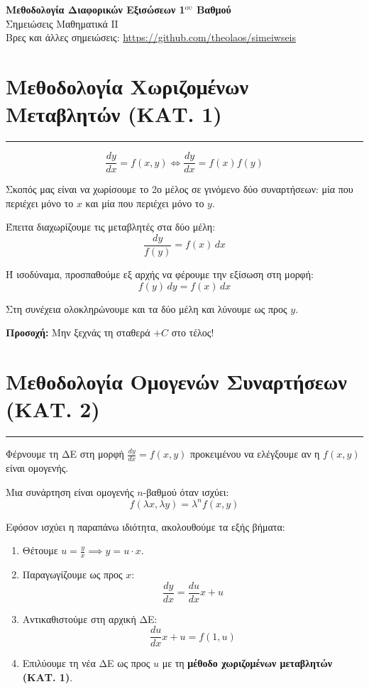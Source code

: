 \documentclass[12pt,a4paper]{article}
\begin{document}
\begin{center}
    \LARGE \textbf{Μεθοδολογία Διαφορικών Εξισώσεων 1$^{\text{ου}}$ Βαθμού}\\[0.5ex]
    \large Σημειώσεις Μαθηματικά ΙΙ \\
    \normalsize Βρες και άλλες σημειώσεις: \url{https://github.com/theolaos/simeiwseis}
\end{center}

\section*{Μεθοδολογία Χωριζομένων Μεταβλητών (ΚΑΤ. 1)}
\vspace{-1em}
\hrule
\vspace{1em}


\[
\frac{dy}{dx} = f(x,y) \iff \frac{dy}{dx} = f(x)f(y)
\]

Σκοπός μας είναι να χωρίσουμε το 2ο μέλος σε γινόμενο δύο συναρτήσεων: μία που περιέχει μόνο το $x$ και μία που περιέχει μόνο το $y$.

Έπειτα διαχωρίζουμε τις μεταβλητές στα δύο μέλη:
\[
\frac{dy}{f(y)} = f(x)\,dx
\]

Ή ισοδύναμα, προσπαθούμε εξ αρχής να φέρουμε την εξίσωση στη μορφή:
\[
f(y)\,dy = f(x)\,dx
\]

Στη συνέχεια ολοκληρώνουμε και τα δύο μέλη και λύνουμε ως προς $y$.

\textbf{Προσοχή:} Μην ξεχνάς τη σταθερά $+C$ στο τέλος!


\section*{Μεθοδολογία Ομογενών Συναρτήσεων (ΚΑΤ. 2)}
\vspace{-1em}
\hrule
\vspace{1em}

Φέρνουμε τη ΔΕ στη μορφή $\frac{dy}{dx} = f(x,y)$ προκειμένου να ελέγξουμε αν η $f(x,y)$ είναι ομογενής.

Μια συνάρτηση είναι ομογενής $n$-βαθμού όταν ισχύει:
\[
f(\lambda x, \lambda y) = \lambda^n f(x,y)
\]

Εφόσον ισχύει η παραπάνω ιδιότητα, ακολουθούμε τα εξής βήματα:
\begin{enumerate}[leftmargin=*]
    \item Θέτουμε $u = \frac{y}{x} \implies y = u \cdot x$.
    \item Παραγωγίζουμε ως προς $x$:
    \[
    \frac{dy}{dx} = \frac{du}{dx} x + u
    \]
    \item Αντικαθιστούμε στη αρχική ΔΕ:
    \[
    \frac{du}{dx} x + u = f(1,u)
    \]
    \item Επιλύουμε τη νέα ΔΕ ως προς $u$ με τη \textbf{μέθοδο χωριζομένων μεταβλητών (ΚΑΤ. 1)}.
\end{enumerate}
\end{document}
